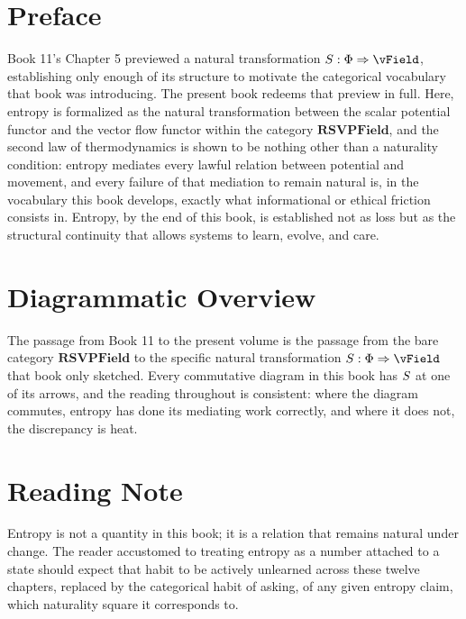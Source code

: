 \chapter*{Preface}

Book 11's Chapter 5 previewed a natural transformation $\SEntropy: \PhiField \Rightarrow \vField$, establishing only enough of its structure to motivate the categorical vocabulary that book was introducing. The present book redeems that preview in full. Here, entropy is formalized as the natural transformation between the scalar potential functor and the vector flow functor within the category $\mathbf{RSVPField}$, and the second law of thermodynamics is shown to be nothing other than a naturality condition: entropy mediates every lawful relation between potential and movement, and every failure of that mediation to remain natural is, in the vocabulary this book develops, exactly what informational or ethical friction consists in. Entropy, by the end of this book, is established not as loss but as the structural continuity that allows systems to learn, evolve, and care.

\chapter*{Diagrammatic Overview}

The passage from Book 11 to the present volume is the passage from the bare category $\mathbf{RSVPField}$ to the specific natural transformation $\SEntropy: \PhiField \Rightarrow \vField$ that book only sketched. Every commutative diagram in this book has $S$ at one of its arrows, and the reading throughout is consistent: where the diagram commutes, entropy has done its mediating work correctly, and where it does not, the discrepancy is heat.

\chapter*{Reading Note}

Entropy is not a quantity in this book; it is a relation that remains natural under change. The reader accustomed to treating entropy as a number attached to a state should expect that habit to be actively unlearned across these twelve chapters, replaced by the categorical habit of asking, of any given entropy claim, which naturality square it corresponds to.

